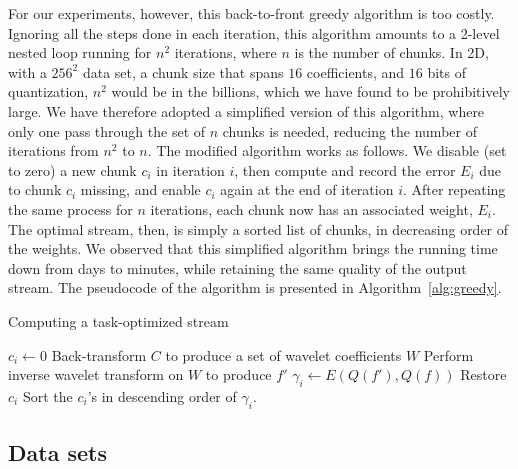 For our experiments, however, this back-to-front greedy algorithm is too costly. Ignoring all the
steps done in each iteration, this algorithm amounts to a 2-level nested loop running for $n^2$
iterations, where $n$ is the number of chunks. In 2D, with a $256^2$ data set, a chunk size that
spans $16$ coefficients, and $16$ bits of quantization, $n^2$ would be in the billions, which we
have found to be prohibitively large. We have therefore adopted a simplified version of this
algorithm, where only one pass through the set of $n$ chunks is needed, reducing the number of
iterations from $n^2$ to $n$. The modified algorithm works as follows. We disable (set to zero) a
new chunk $c_i$ in iteration $i$, then compute and record the error $E_i$ due to chunk $c_i$
missing, and enable $c_i$ again at the end of iteration $i$. After repeating the same process for
$n$ iterations, each chunk now has an associated weight, $E_i$. The optimal stream, then, is simply
a sorted list of chunks, in decreasing order of the weights. We observed that this simplified
algorithm brings the running time down from days to minutes, while retaining the same quality of the
output stream. The pseudocode of the algorithm is presented in Algorithm~\ref{alg:greedy}.

\begin{algorithm}[h]
  \caption{Computing a task-optimized stream}
  \begin{algorithmic}[1]
			\State $c_i \gets 0$
      \State Back-transform $C$ to produce a set of wavelet coefficients $W$
			\State Perform inverse wavelet transform on $W$ to produce $f'$
			\State $\gamma_i \gets E(Q(f'),Q(f))$			
			\State Restore $c_i$
		\EndFor
		\State Sort the $c_i$'s in descending order of $\gamma_i$.
	\end{algorithmic}
	\label{alg:greedy}
\end{algorithm}

\subsection{Data sets}
\label{sec:data-sets}

